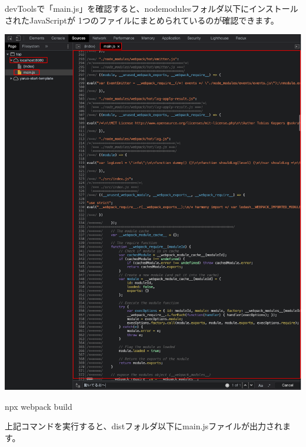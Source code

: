 devToolsで「main.js」を確認すると、node\textunderscore{}modulesフォルダ以下にインストールされたJavaScriptが
1つのファイルにまとめられているのが確認できます。

\begin{reviewimage}%
\includegraphics[width=1.0\maxwidth]{./images/02-create-react-app/webpack_test02.png}%
\label{image:02-create-react-app:webpack_test02}
\end{reviewimage}

npx webpack build

上記コマンドを実行すると、distフォルダ以下にmain.jsファイルが出力されます。

